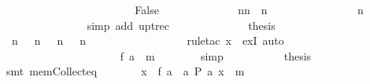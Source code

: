 \begin{isabellebody}
\ \ \ \ \ \ \ \ \ \ \isamarkupfalse%
\isanewline
\ \ \ \ \ \ \ \ \ \ \ \ \isamarkupfalse%
\ False\isanewline
\ \ \ \ \ \ \ \ \ \ \ \ \isamarkupfalse%
\ {\isachardoublequoteopen}{\isacharbrackleft}n{\isacharminus}{}{\isachardot}{\isachardot}{\isacharless}n{\isacharbrackright}\ {\isacharequal}\ {\isacharbrackleft}n{\isacharminus}{}{\isacharbrackright}{\isachardoublequoteclose}\isanewline
\ \ \ \ \ \ \ \ \ \ \ \ \ \ \isamarkupfalse%
\ {\isacharbackquoteopen}n\ {\isasymge}\ {}{\isacharbackquoteclose}\isanewline
\ \ \ \ \ \ \ \ \ \ \ \ \ \ \isamarkupfalse%
\ {\isacharparenleft}simp\ add{\isacharcolon}\ upt{\isacharunderscore}rec{\isacharparenright}\isanewline
\ \ \ \ \ \ \ \ \ \ \ \ \isamarkupfalse%
\ {\isacharquery}thesis\isanewline
\ \ \ \ \ \ \ \ \ \ \ \ \ \ \isamarkupfalse%
\ {\isacharbackquoteopen}{\isasymnot}\ n\ {\isacharless}\ {}{}{}{}{\isacharbackquoteclose}\ {\isacharbackquoteopen}n\ {\isasymnoteq}\ {}{}{}{}{\isacharbackquoteclose}\ {\isacharbackquoteopen}n\ {\isasymnoteq}\ {}{}{}{}{\isacharbackquoteclose}\ {\isacharbackquoteopen}n\ {\isasymge}\ {}{\isacharbackquoteclose}\isanewline
\ \ \ \ \ \ \ \ \ \ \ \ \ \ \isamarkupfalse%
\ {\isacharparenleft}rule{\isacharunderscore}tac\ x{\isacharequal}{}\ \ exI{\isacharcomma}\ auto{\isacharparenright}\isanewline
\ \ \ \ \ \ \ \ \ \ \isamarkupfalse%
\isanewline
\ \ \ \ \ \ \ \ \isamarkupfalse%
\isanewline
\ \ \ \ \ \ \isamarkupfalse%
\isanewline
\ \ \ \ \isamarkupfalse%
\isanewline
\ \ \ \ \isamarkupfalse%
\isanewline
\ \ \ \ \isamarkupfalse%
\ {\isachardoublequoteopen}{\isacharquery}f\ {\isacharquery}a\ {\isacharequal}\ {\isacharquery}m{\isachardoublequoteclose}\isanewline
\ \ \ \ \ \ \isamarkupfalse%
\ simp\isanewline
\ \ \ \ \isamarkupfalse%
\isanewline
\ \ \ \ \isamarkupfalse%
\ {\isacharquery}thesis\isanewline
\ \ \ \ \ \ \isamarkupfalse%
\ {\isacharparenleft}smt\ mem{\isacharunderscore}Collect{\isacharunderscore}eq{\isacharparenright}\isanewline
\ \ \isamarkupfalse%
\isanewline
{}\isamarkupfalse%
\isanewline
\ \ \isamarkupfalse%
\ {\isachardoublequoteopen}{\isasymforall}\ x{\isacharprime}\ {\isasymin}\ {\isacharbraceleft}{\isacharquery}f\ a\ {\isacharbar}\ a{\isachardot}\ {\isacharquery}P\ a{\isacharbraceright}{\isachardot}\ x{\isacharprime}\ {\isasymle}\ {\isacharquery}m{\isachardoublequoteclose}\isanewline

\end{isabellebody}
